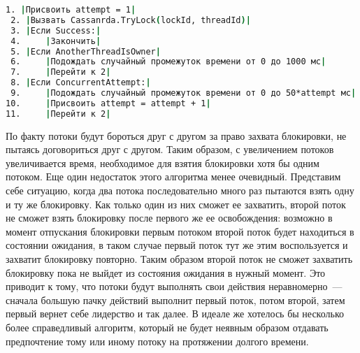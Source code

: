 \begin{lstlisting}[language=csh,caption={Алгоритм Cassandra.GetLock(lockId, threadId)}]
 1. |Присвоить attempt = 1|
 2. |Вызвать Cassanrda.TryLock(lockId, threadId)|
 3. |Если Success:|
 4. 	|Закончить|
 5. |Если AnotherThreadIsOwner|
 6. 	|Подождать случайный промежуток времени от 0 до 1000 мс|
 7. 	|Перейти к 2|
 8. |Если ConcurrentAttempt:|
 9. 	|Подождать случайный промежуток времени от 0 до 50*attempt мс|
10. 	|Присвоить attempt = attempt + 1|
11. 	|Перейти к 2|
\end{lstlisting}

По факту потоки будут бороться друг с другом за право захвата блокировки, не пытаясь договориться друг с другом. Таким образом, с увеличением потоков увеличивается время, необходимое для взятия блокировки хотя бы одним потоком. Еще один недостаток этого алгоритма менее очевидный. Представим себе ситуацию, когда два потока последовательно много раз пытаются взять одну и ту же блокировку. Как только один из них сможет ее захватить, второй поток не сможет взять блокировку после первого же ее освобождения: возможно в момент отпускания блокировки первым потоком второй поток будет находиться в состоянии ожидания, в таком случае первый поток тут же этим воспользуется и захватит блокировку повторно. Таким образом второй поток не сможет захватить блокировку пока не выйдет из состояния ожидания в нужный момент. Это приводит к тому, что потоки будут выполнять свои действия неравномерно~--- сначала большую пачку действий выполнит первый поток, потом второй, затем первый вернет себе лидерство и так далее. В идеале же хотелось бы несколько более справедливый алгоритм, который не будет неявным образом отдавать предпочтение тому или иному потоку на протяжении долгого времени.